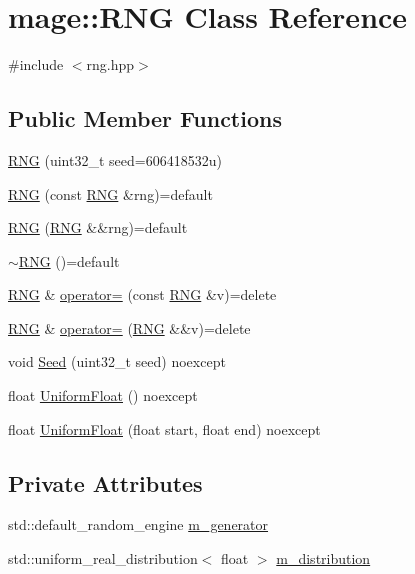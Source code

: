 \hypertarget{classmage_1_1_r_n_g}{}\section{mage\+:\+:R\+NG Class Reference}
\label{classmage_1_1_r_n_g}


{\ttfamily \#include $<$rng.\+hpp$>$}

\subsection*{Public Member Functions}
\begin{DoxyCompactItemize}
\item 
\hyperlink{classmage_1_1_r_n_g_a32f44a150b86ec27be5b4f6f39e9eb1c}{R\+NG} (uint32\+\_\+t seed=606418532u)
\item 
\hyperlink{classmage_1_1_r_n_g_ae85dd3ab6679a308610880779d65955a}{R\+NG} (const \hyperlink{classmage_1_1_r_n_g}{R\+NG} \&rng)=default
\item 
\hyperlink{classmage_1_1_r_n_g_aea109c4ab1644a5294d7c2c1031a50c9}{R\+NG} (\hyperlink{classmage_1_1_r_n_g}{R\+NG} \&\&rng)=default
\item 
\hyperlink{classmage_1_1_r_n_g_a20d24aabf31837e48a38b9ca221b0a9b}{$\sim$\+R\+NG} ()=default
\item 
\hyperlink{classmage_1_1_r_n_g}{R\+NG} \& \hyperlink{classmage_1_1_r_n_g_aa78921ff1b314fdd1e6ce0ea4944a0fc}{operator=} (const \hyperlink{classmage_1_1_r_n_g}{R\+NG} \&v)=delete
\item 
\hyperlink{classmage_1_1_r_n_g}{R\+NG} \& \hyperlink{classmage_1_1_r_n_g_a8f8f5ce4ae6e46953b00db654bb22f52}{operator=} (\hyperlink{classmage_1_1_r_n_g}{R\+NG} \&\&v)=delete
\item 
void \hyperlink{classmage_1_1_r_n_g_a3153153ce32679f0431a3b5554a899a4}{Seed} (uint32\+\_\+t seed) noexcept
\item 
float \hyperlink{classmage_1_1_r_n_g_af6021a6a30b1d45ad8fd46fa57f86074}{Uniform\+Float} () noexcept
\item 
float \hyperlink{classmage_1_1_r_n_g_a2b8c3ad557d6f6e0660c18defdc67f61}{Uniform\+Float} (float start, float end) noexcept
\end{DoxyCompactItemize}
\subsection*{Private Attributes}
\begin{DoxyCompactItemize}
\item 
std\+::default\+\_\+random\+\_\+engine \hyperlink{classmage_1_1_r_n_g_a43dc452c2e32d468fa42d16e02d3a283}{m\+\_\+generator}
\item 
std\+::uniform\+\_\+real\+\_\+distribution$<$ float $>$ \hyperlink{classmage_1_1_r_n_g_af0f87b95305e05fd560911e0068e6498}{m\+\_\+distribution}
\end{DoxyCompactItemize}


